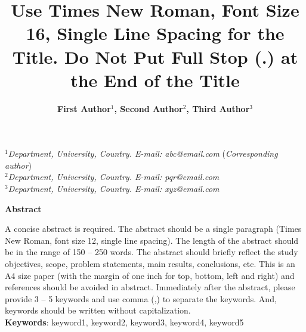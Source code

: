 \documentclass[a4paper,12pt]{article}
\begin{document}
\title
{\Large\bf Use Times New Roman, Font Size 16, Single Line Spacing for the Title. Do Not Put Full Stop (.) at the End of the Title}

\author{\normalsize{\bf First Author$^1$, Second Author$^{2}$, Third Author$^3$}
}

\date{}

\maketitle
\thispagestyle{fancy}

\begin{center}
  $^1$\textit{Department, University, Country. E-mail: abc@email.com} (\textit{Corresponding author})\\
  $^2$\textit{Department, University, Country. E-mail: pqr@email.com} \\
  $^3$\textit{Department, University, Country. E-mail: xyz@email.com}
\end{center}


\bigskip

\centerline{\textbf{Abstract}}

\bigskip
\noindent
A concise abstract is required. The abstract should be a single paragraph (Times New Roman, font size 12, single line spacing). The length of the abstract should be in the range of 150 -- 250 words. The abstract should briefly reflect the study objectives, scope, problem statements, main results, conclusions, etc. This is an A4 size paper (with the margin of one inch for top, bottom, left and right) and references should be avoided in abstract. Immediately after the abstract, please provide 3 -- 5 keywords and use comma (,) to separate the keywords. And, keywords should be written without capitalization. \\

\noindent
{\bf Keywords}: keyword1, keyword2, keyword3, keyword4, keyword5
\end{document}

